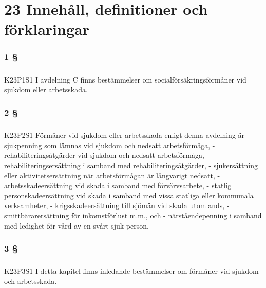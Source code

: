 \documentclass[a4paper,notitlepage,openany,10pt]{book}
\begin{document}
\chapter*{23 Innehåll, definitioner och förklaringar}
\subsection*{1 §}
\paragraph*{}
{\tiny K23P1S1}
I avdelning C finns bestämmelser om socialförsäkringsförmåner vid sjukdom eller arbetsskada.
\subsection*{2 §}
\paragraph*{}
{\tiny K23P2S1}
Förmåner vid sjukdom eller arbetsskada enligt denna avdelning är
\newline - sjukpenning som lämnas vid sjukdom och nedsatt arbetsförmåga,
\newline - rehabiliteringsåtgärder vid sjukdom och nedsatt arbetsförmåga,
\newline - rehabiliteringsersättning i samband med rehabiliteringsåtgärder,
\newline - sjukersättning eller aktivitetsersättning när arbetsförmågan är långvarigt nedsatt,
\newline - arbetsskadeersättning vid skada i samband med förvärvsarbete,
\newline - statlig personskadeersättning vid skada i samband med vissa statliga eller kommunala verksamheter,
\newline - krigsskadeersättning till sjömän vid skada utomlands,
\newline - smittbärarersättning för inkomstförlust m.m., och
\newline - närståendepenning i samband med ledighet för vård av en svårt sjuk person.
\subsection*{3 §}
\paragraph*{}
{\tiny K23P3S1}
I detta kapitel finns inledande bestämmelser om förmåner vid sjukdom och arbetsskada.
\end{document}
